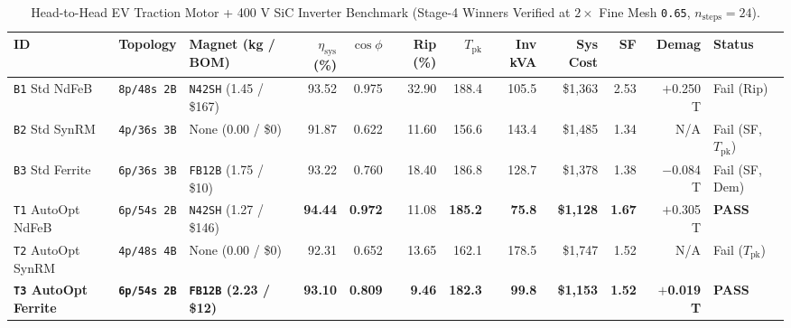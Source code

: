 \documentclass[twocolumn,10pt]{article}
\begin{document}
\begin{table}[t]
\centering
\caption{Head-to-Head EV Traction Motor + 400 V SiC Inverter Benchmark (Stage-4 Winners Verified at $2\times$ Fine Mesh \texttt{0.65}, $n_{\text{steps}}=24$).}
\label{tab:motor_main}
\scriptsize
\begin{tabular}{@{}lllrrrrrrrrl@{}}
\toprule
\textbf{ID} & \textbf{Topology} & \textbf{Magnet (kg / BOM)} & \textbf{$\eta_{\text{sys}}$ (\%)} & \textbf{$\cos\phi$} & \textbf{Rip (\%)} & \textbf{$T_{\text{pk}}$} & \textbf{Inv kVA} & \textbf{Sys Cost} & \textbf{SF} & \textbf{Demag} & \textbf{Status} \\
\midrule
\texttt{B1} Std NdFeB & \texttt{8p/48s 2B} & \texttt{N42SH} (1.45 / \$167) & 93.52 & 0.975 & 32.90 & 188.4 & 105.5 & \$1{,}363 & 2.53 & $+$0.250 T & Fail (Rip) \\
\texttt{B2} Std SynRM & \texttt{4p/36s 3B} & None (0.00 / \$0) & 91.87 & 0.622 & 11.60 & 156.6 & 143.4 & \$1{,}485 & 1.34 & N/A & Fail (SF, $T_{\text{pk}}$) \\
\texttt{B3} Std Ferrite & \texttt{6p/36s 3B} & \texttt{FB12B} (1.75 / \$10) & 93.22 & 0.760 & 18.40 & 186.8 & 128.7 & \$1{,}378 & 1.38 & $-$0.084 T & Fail (SF, Dem) \\
\midrule
\texttt{T1} AutoOpt NdFeB & \texttt{6p/54s 2B} & \texttt{N42SH} (1.27 / \$146) & \textbf{94.44} & \textbf{0.972} & 11.08 & \textbf{185.2} & \textbf{75.8} & \textbf{\$1{,}128} & \textbf{1.67} & $+$0.305 T & \textbf{PASS} \\
\texttt{T2} AutoOpt SynRM & \texttt{4p/48s 4B} & None (0.00 / \$0) & 92.31 & 0.652 & 13.65 & 162.1 & 178.5 & \$1{,}747 & 1.52 & N/A & Fail ($T_{\text{pk}}$) \\
\textbf{\texttt{T3} AutoOpt Ferrite} & \textbf{\texttt{6p/54s 2B}} & \textbf{\texttt{FB12B} (2.23 / \$12)} & \textbf{93.10} & \textbf{0.809} & \textbf{9.46} & \textbf{182.3} & \textbf{99.8} & \textbf{\$1{,}153} & \textbf{1.52} & \textbf{$+$0.019 T} & \textbf{PASS} \\
\bottomrule
\end{tabular}
\end{table}
\end{document}
